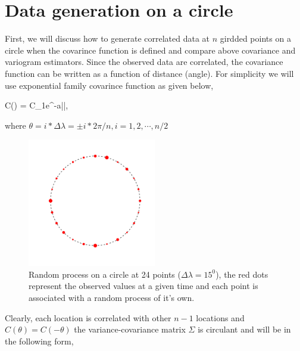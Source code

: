 

\section{Data generation on a circle}



First, we will discuss how to generate correlated data at $n$ girdded points on a circle when the covarince function is defined and compare above covariance and variogram estimators. Since the observed data are correlated, the covariance function can be written as a function of distance (angle). For simplicity we will use exponential family covarince function as given below, 

\beq \label{exp_covarince} 
C(\theta) = C_1e^{-a|\theta|},
\eeq

where $\theta = i*\Delta\lambda = \pm i*2\pi/n, i=1,2,\cdots,n/2$\\

\begin{figure}
	\centering
	\includegraphics[width=0.5\textwidth]{graphs/process_circle}
	\caption {Random process on a circle at 24 points ($\Delta\lambda = 15^0$), the red dots represent the  observed values at a given time and each point is associated with a random process of it's own.}
\end{figure}

Clearly, each location is correlated with other $n-1$ locations and $C(\theta) = C(-\theta)$ the variance-covariance matrix $\Sigma$ is circulant and will be in the following form,   


